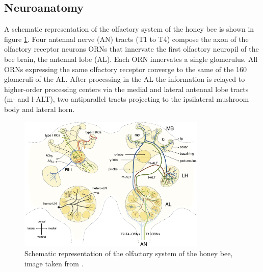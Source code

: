   \subsection{Neuroanatomy}
  A schematic representation of the olfactory system of the honey bee is shown in figure \ref{fig:olfactory-system}.
  Four antennal nerve (AN) tracts (T1 to T4) compose the axon of the olfactory receptor neurons ORNs that innervate the first olfactory neuropil of the bee brain, the antennal lobe (AL).
  Each ORN innervates a single glomerulus.
  All ORNs expressing the same olfactory receptor converge to the same of the 160 glomeruli of the AL.
  After processing in the AL the information is relayed to higher-order processing centers via the medial and lateral antennal lobe tracts (m- and l-ALT), two antiparallel tracts projecting to the ipsilateral mushroom body and lateral horn.

  \begin{figure}
    \centering
    \includegraphics[width=0.8\textwidth]{organisation_olfactory_system}
    \caption{Schematic representation of the olfactory system of the honey bee, image taken from \cite{olfactory-coding-honeybee}.}
    \label{fig:olfactory-system}
  \end{figure}

